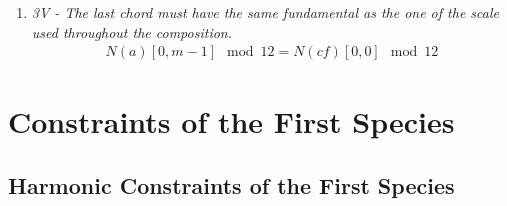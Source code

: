 \begin{enumerate}[wide, label=\bfseries G\arabic*]
\item \textit{3V - The last chord must have the same fundamental as the one of the scale used throughout the composition.}\label{rule:same-fundamental-appendix}
\begin{equation} \begin{aligned}
    N(a)[0, m-1] \mod 12 = N(cf)[0, 0] \mod 12
    \end{aligned} \end{equation}
\end{enumerate}


\section*{Constraints of the First Species}
\subsection*{Harmonic Constraints of the First Species}
